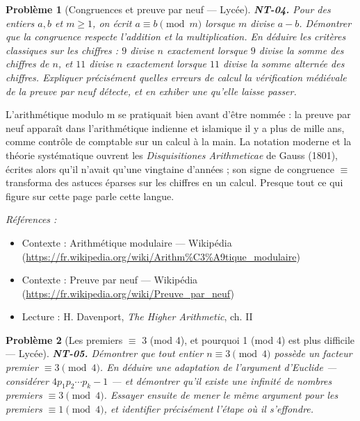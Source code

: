 \documentclass[11pt]{article}
\newtheorem{problem}{Problème}
\newenvironment{refs}{\par\small\noindent\emph{Références :}\begin{itemize}\setlength\itemsep{0pt}}{\end{itemize}\normalsize}
\begin{document}
\bigskip

\begin{problem}[{Congruences et preuve par neuf --- Lycée}]
\textbf{NT-04.} Pour des entiers $a, b$ et $m \ge 1$, on écrit
$a \equiv b \pmod{m}$ lorsque $m$ divise $a - b$. Démontrer que la congruence respecte
l'addition et la multiplication. En déduire les critères classiques sur les chiffres : $9$ divise
$n$ exactement lorsque $9$ divise la somme des chiffres de $n$, et $11$ divise $n$
exactement lorsque $11$ divise la somme alternée des chiffres. Expliquer précisément quelles
erreurs de calcul la vérification médiévale de la \og{} preuve par neuf \fg{} détecte, et en exhiber une
qu'elle laisse passer.
\end{problem}

\noindent L'arithmétique modulo m se pratiquait bien avant d'être nommée : la preuve par
neuf apparaît dans l'arithmétique indienne et islamique il y a plus de mille ans, comme contrôle de
comptable sur un calcul à la main. La notation moderne et la théorie systématique ouvrent les
\textit{Disquisitiones Arithmeticae} de Gauss (1801), écrites alors qu'il n'avait qu'une vingtaine
d'années ; son signe de congruence $\equiv$ transforma des astuces éparses sur les chiffres en un calcul.
Presque tout ce qui figure sur cette page parle cette langue.

\begin{refs}
\item Contexte : Arithmétique modulaire --- Wikipédia (\url{https://fr.wikipedia.org/wiki/Arithm%C3%A9tique_modulaire})
\item Contexte : Preuve par neuf --- Wikipédia (\url{https://fr.wikipedia.org/wiki/Preuve_par_neuf})
\item Lecture : H. Davenport, \textit{The Higher Arithmetic}, ch. II
\end{refs}

\bigskip

\begin{problem}[{Les premiers $\equiv$ 3 (mod 4), et pourquoi 1 (mod 4) est plus difficile --- Lycée}]
\textbf{NT-05.} Démontrer que tout entier $n \equiv 3 \pmod 4$ possède un
facteur premier $\equiv 3 \pmod 4$. En déduire une adaptation de l'argument d'Euclide --- considérer
$4p_1 p_2 \cdots p_k - 1$ --- et démontrer qu'il existe une infinité de nombres premiers
$\equiv 3 \pmod 4$. Essayer ensuite de mener le même argument pour les premiers
$\equiv 1 \pmod 4$, et identifier précisément l'étape où il s'effondre.
\end{problem}
\end{document}
